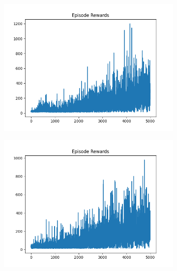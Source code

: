 \begin{figure}[H]
    \centering
    \begin{subfigure}{.47\linewidth}
        \centering
        \includegraphics[width=\textwidth]{pole/2024-06-13_21-45-52_dqn_cartpole_episode_rewards.png}
    \end{subfigure}
    \begin{subfigure}{.47\linewidth}
        \centering
        \includegraphics[width=\textwidth]{pole/2024-06-13_21-08-24_dqn_cartpole_episode_rewards.png}
    \end{subfigure}
    \begin{subfigure}{.47\linewidth}
        \centering

\end{subfigure}
\end{figure}
